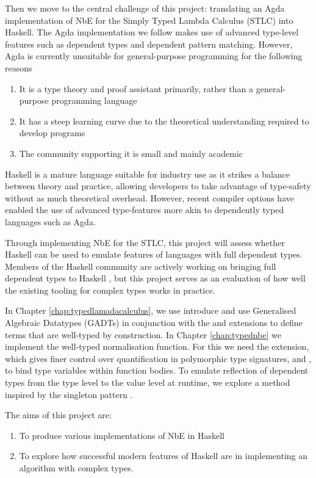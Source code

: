 Then we move to the central challenge of this project: translating an Agda implementation of NbE for the Simply Typed Lambda Calculus (STLC) into Haskell. The Agda implementation we follow makes use of advanced type-level features such as dependent types and dependent pattern matching. However, Agda is currently unsuitable for general-purpose programming for the following reasons

\begin{enumerate}
    \item It is a type theory and proof assistant primarily, rather than a general-purpose programming language
    \item It has a steep learning curve due to the theoretical understanding required to develop programs
    \item The community supporting it is small and mainly academic
\end{enumerate}

Haskell is a mature language suitable for industry use \cite{haskellInIndustry} as it strikes a balance between theory and practice, allowing developers to take advantage of type-safety without as much theoretical overhead. However, recent compiler options have enabled the use of advanced type-features more akin to dependently typed languages such as Agda. 

Through implementing NbE for the STLC, this project will assess whether Haskell can be used to emulate features of languages with full dependent types. Members of the Haskell community are actively working on bringing full dependent types to Haskell \cite{DH}, but this project serves as an evaluation of how well the existing tooling for complex types works in practice.

In Chapter \ref{chap:typedlamadacalculus}, we use introduce and use Generalised Algebraic Datatypes (GADTs) in conjunction with the  and  extensions to define terms that are well-typed by construction. 
In Chapter \ref{chap:typednbe} we implement the well-typed normalisation function. For this we need the  extension, which gives finer control over quantification in polymorphic type signatures, and , to bind type variables within function bodies. To emulate reflection of dependent types from the type level to the value level at runtime, we explore a method inspired by the singleton pattern \cite{singletons}.

The aims of this project are:
\begin{enumerate}
    \item To produce various implementations of NbE in Haskell
    \item To explore how successful modern features of Haskell are in implementing an algorithm with complex types.
\end{enumerate}